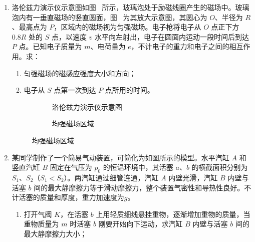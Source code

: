 \begin{enumerate}
\item
洛伦兹力演示仪示意图如图~ 所示，玻璃泡处于励磁线圈产生的磁场中。玻璃泡内有一垂直磁场的竖直圆面，图~ 为其放大示意图，其圆心为 $ O $、半径为 $ R $、最高点为 $ P $，区域内的磁场视为匀强磁场。电子枪将电子从 $ O $ 点正下方 $ 0.8 R $ 处的 $ S $ 点，以速度 $ v $ 水平向左射出，电子在圆面内运动一段时间后到达 $ P $ 点。已知电子质量为 $ m $、电荷量为 $ e $，不计电子的重力和电子之间的相互作用。求：
\begin{enumerate}
	\item 
	匀强磁场的磁感应强度大小和方向；
	
	\item
	电子从 $ S $ 点第一次到达 $ P $ 点所用的时间。
\end{enumerate}
\begin{figure}[htbp]
	\raggedleft
	\begin{subfigure}{0.4\linewidth}
		\centering
		
		\caption{洛伦兹力演示仪示意图}\label{2026云南15a}
	\end{subfigure}
	\begin{subfigure}{0.4\linewidth}
		\centering
		
		\caption{均强磁场区域}\label{2026云南15b}
	\end{subfigure}
\end{figure}

\item
某同学制作了一个简易气动装置，可简化为如图所示的模型。水平汽缸 $ A $ 和竖直汽缸 $ B $ 固定在气压为 $ p_{0} $ 的恒温环境中，其活塞 $ a $、$ b $ 的横截面积分别为 $ S_{1} $、$ S_{2} $（$S_{1} < S_{2}$）。两汽缸通过细管连通，汽缸 $ A $ 内壁光滑，汽缸 $ B $ 内壁与活塞 $ b $ 间的最大静摩擦力等于滑动摩擦力，整个装置气密性和导热性良好。不计活塞的质量和厚度，重力加速度为$ g $。
\begin{enumerate}
	\item 
打开气阀 $ K $，在活塞 $ b $ 上用轻质细线悬挂重物，逐渐增加重物的质量，当重物质量为 $ m $ 时活塞 $ b $ 刚要开始向下运动，求汽缸 $ B $ 内壁与活塞 $ b $ 间的最大静摩擦力大小；


\end{enumerate}
\end{enumerate}
